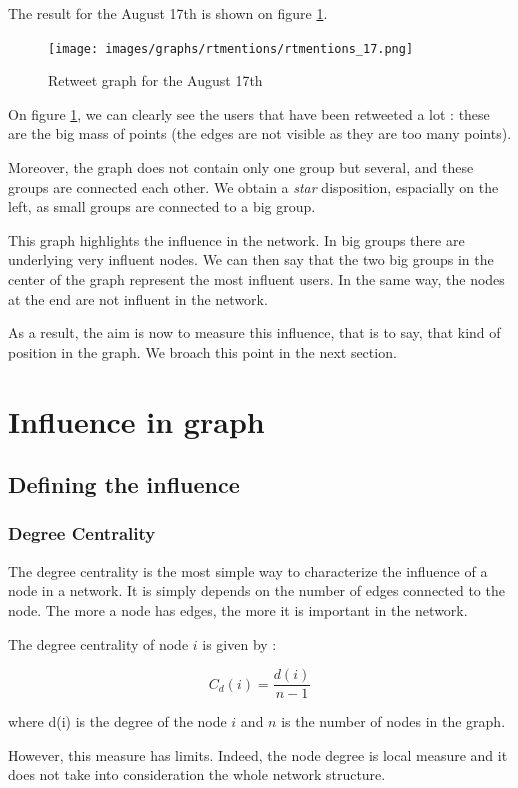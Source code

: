 \documentclass[a4paper,twoside,12pt,openright]{report}
\begin{document}
The result for the August 17th is shown on figure \ref{rtGraph17}.

\begin{figure}[H]
\centering
\texttt{[image: images/graphs/rtmentions/rtmentions\_17.png]}
\caption{Retweet graph for the August 17th}
\label{rtGraph17}
\end{figure}

On figure \ref{rtGraph17}, we can clearly see the users that have been retweeted a lot : these are the big mass of points (the edges are not visible as they are too many points).

Moreover, the graph does not contain only one group but several, and these groups are connected each other. We obtain a \emph{star} disposition, espacially on the left, as small groups are connected to a big group.

This graph highlights the influence in the network. In big groups there are underlying very influent nodes. We can then say that the two big groups  in the center of the graph represent the most influent users. In the same way, the nodes at the end are not influent in the network.

As a result, the aim is now to measure this influence, that is to say, that kind of position in the graph. We broach this point in the next section.

\newpage
\section{Influence in graph}	
\subsection{Defining the influence}

\subsubsection{Degree Centrality}
The degree centrality is the most simple way to characterize the influence of a node in a network. It is simply depends on the number of edges connected to the node. The more a node has edges, the more it is important in the network.

The degree centrality of node $i$ is given by :

$$ C_d(i) = \frac{d(i)}{n-1} $$

where d(i) is the degree of the node $i$ and $n$ is the number of nodes in the graph.

However, this measure has limits. Indeed, the node degree is local measure and it does not take into consideration the whole network structure.
\end{document}
